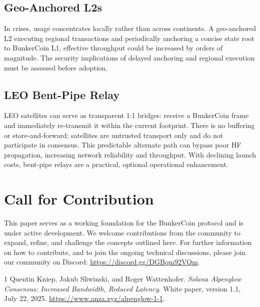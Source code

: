 \documentclass{article}
\begin{document}
\subsection{Geo-Anchored L2s}

In crises, usage concentrates locally rather than across continents. A geo-anchored L2 executing regional transactions and periodically anchoring a concise state root to BunkerCoin L1, effective throughput could be increased by orders of magnitude. The security implications of delayed anchoring and regional execution must be assessed before adoption.

\subsection{LEO Bent-Pipe Relay}

LEO satellites can serve as transparent 1:1 bridges: receive a BunkerCoin frame and immediately re-transmit it within the current footprint. There is no buffering or store-and-forward; satellites are untrusted transport only and do not participate in consensus. This predictable alternate path can bypass poor HF propagation, increasing network reliability and throughput. With declining launch costs, bent-pipe relays are a practical, optional operational enhancement.

\section{Call for Contribution}

This paper serves as a working foundation for the BunkerCoin protocol and is under active development. We welcome contributions from the community to expand, refine, and challenge the concepts outlined here. For further information on how to contribute, and to join the ongoing technical discussions, please join our community on Discord: \url{https://discord.gg/DGBqm92VQm}.

\begin{thebibliography}{1}
Quentin Kniep, Jakub Sliwinski, and Roger Wattenhofer.
\emph{Solana Alpenglow Consensus: Increased Bandwidth, Reduced Latency}.
White paper, version 1.1, July 22, 2025.
\url{https://www.anza.xyz/alpenglow-1-1}.
\end{thebibliography}
\end{document}
